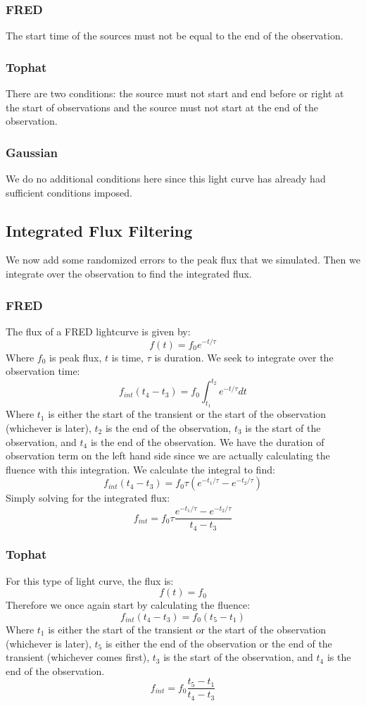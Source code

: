 \documentclass{article}
\begin{document}
\subsubsection{FRED}
The start time of the sources must not be equal to the end of the observation.
\subsubsection{Tophat}
There are two conditions: the source must not start and end before or right at the start of observations and the source must not start at the end of the observation.
\subsubsection{Gaussian}
We do no additional conditions here since this light curve has already had sufficient conditions imposed.
\subsection{Integrated Flux Filtering}
We now add some randomized errors to the peak flux that we simulated. Then we integrate over the observation to find the integrated flux. 
\subsubsection{FRED}
The flux of a FRED lightcurve is given by:
\[f(t)=f_0e^{-t/\tau}\]
Where $f_0$ is peak flux, $t$ is time, $\tau$ is duration. We seek to integrate over the observation time:
\[f_{int}(t_4-t_3) = f_0\int_{t_1}^{t_2}e^{-t/\tau}dt\]
Where $t_1$ is either the start of the transient or the start of the observation (whichever is later), $t_2$ is the end of the observation, $t_3$ is the start of the observation, and $t_4$ is the end of the observation. We have the duration of observation term on the left hand side since we are actually calculating the fluence with this integration. We calculate the integral to find:
\[f_{int}(t_4-t_3) = f_0\tau (e^{-t_{1}/\tau}-e^{-t_2/\tau})\]
Simply solving for the integrated flux:
\[f_{int} = f_0\tau \frac{e^{-t_{1}/\tau}-e^{-t_2/\tau}}{t_4-t_3}\]
\subsubsection{Tophat}
For this type of light curve, the flux is:
\[f(t) = f_0\]
Therefore we once again start by calculating the fluence:
\[f_{int} (t_4-t_3) = f_0 (t_5-t_1)\]
Where $t_1$ is either the start of the transient or the start of the observation (whichever is later), $t_5$ is either the end of the observation or the end of the transient (whichever comes first), $t_3$ is the start of the observation, and $t_4$ is the end of the observation.
\[f_{int}  = f_0 \frac{t_5-t_1}{t_4-t_3}\]
\end{document}
